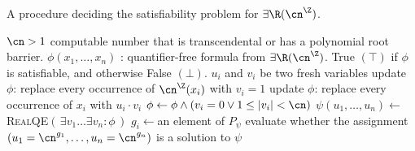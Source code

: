 \begin{algorithm}[t]
  \caption{A procedure deciding the satisfiability problem for $\exists\R(\ipow{\cn})$.}\label{algo:main-procedure}
  \begin{algorithmic}[1]
    \Fixed $\cn > 1$ computable number that is transcendental or has a polynomial root barrier.
    \Require $\phi(x_1,\dots,x_n)$ : quantifier-free formula from
    $\exists\R(\ipow{\cn})$.
    \Ensure True $(\top)$ if $\phi$ is satisfiable, and otherwise False
    $(\bot)$.
    \medskip
    \label{algo:line1}
    \Let $u_i$ and $v_i$ be two fresh variables
    \label{algo:line2}
    \EndLet
    \State update $\phi$: replace every occurrence of $\ipow{\cn}(x_i)$ with $v_i=1$
    \label{algo:line3}
    \State update $\phi$: replace every occurrence of $x_i$ with $u_i\cdot v_i$
    \label{algo:line4}
    \State $\phi \gets \phi \land (v_i = 0 \lor 1 \leq \abs{v_i} < \cn)$
    \label{algo:line5}
    \EndFor
    \State $\psi(u_1,\dots,u_n)\gets{}$ \textsc{RealQE}$(\,\exists v_1 \dots
      \exists v_n : \phi\,)$
    \label{algo:line6}
    \label{algo:line7}
    \State \myguess $g_i \gets{}$an element of $P_{\psi}$  
    \label{algo:line8}
    \EndFor
    \State \myreturn evaluate whether the assignment $(u_1 = \cn^{g_1}, \dots, u_n = \cn^{g_n})$ is a solution to $\psi$
    \label{algo:line9}
  \end{algorithmic}
\end{algorithm}
